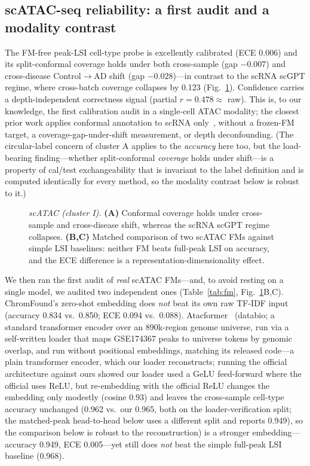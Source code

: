 \documentclass[fleqn,10pt,lineno]{wlpeerj}  %
\newcommand{\fitfig}[1]{\resizebox{\ifdim\width>\linewidth\linewidth\else\width\fi}{!}{#1}}
\begin{document}
\subsection{scATAC-seq reliability: a first audit and a modality contrast}
The FM-free peak-LSI cell-type probe is excellently calibrated (ECE 0.006) and its split-conformal coverage holds under both cross-sample (gap $-0.007$) and cross-disease Control$\to$AD shift (gap $-0.028$)---in contrast to the scRNA scGPT regime, where cross-batch coverage collapses by 0.123 (Fig.~\ref{fig:scatac}). Confidence carries a depth-independent correctness signal (partial $r=0.478\approx$ raw). This is, to our knowledge, the first calibration audit in a single-cell ATAC modality; the closest prior work applies conformal annotation to scRNA only~\cite{lopezdecastro2025}, without a frozen-FM target, a coverage-gap-under-shift measurement, or depth deconfounding. (The circular-label concern of cluster A applies to the \emph{accuracy} here too, but the load-bearing finding---whether split-conformal \emph{coverage} holds under shift---is a property of cal/test exchangeability that is invariant to the label definition and is computed identically for every method, so the modality contrast below is robust to it.)

\begin{figure}[htb]\centering\fitfig{}
\caption{\emph{scATAC (cluster I).} \textbf{(A)} Conformal coverage holds under cross-sample and cross-disease shift, whereas the scRNA scGPT regime collapses. \textbf{(B,C)} Matched comparison of two scATAC FMs against simple LSI baselines: neither FM beats full-peak LSI on accuracy, and the ECE difference is a representation-dimensionality effect.}\label{fig:scatac}\end{figure}

We then ran the first audit of \emph{real} scATAC FMs---and, to avoid resting on a single model, we audited two independent ones (Table~\ref{tab:fm}, Fig.~\ref{fig:scatac}B,C). ChromFound's zero-shot embedding does \emph{not} beat its own raw TF-IDF input (accuracy 0.834 vs.\ 0.850; ECE 0.094 vs.\ 0.088). Atacformer~\cite{atacformer2024} (databio; a standard transformer encoder over an 890k-region genome universe, run via a self-written loader that maps GSE174367 peaks to universe tokens by genomic overlap, and run without positional embeddings, matching its released code---a plain transformer encoder, which our loader reconstructs; running the official architecture against ours showed our loader used a GeLU feed-forward where the official uses ReLU, but re-embedding with the official ReLU changes the embedding only modestly (cosine 0.93) and leaves the cross-sample cell-type accuracy unchanged (0.962 vs.\ our 0.965, both on the loader-verification split; the matched-peak head-to-head below uses a different split and reports 0.949), so the comparison below is robust to the reconstruction) is a stronger embedding---accuracy 0.949, ECE 0.005---yet still does \emph{not} beat the simple full-peak LSI baseline (0.968).
\end{document}
